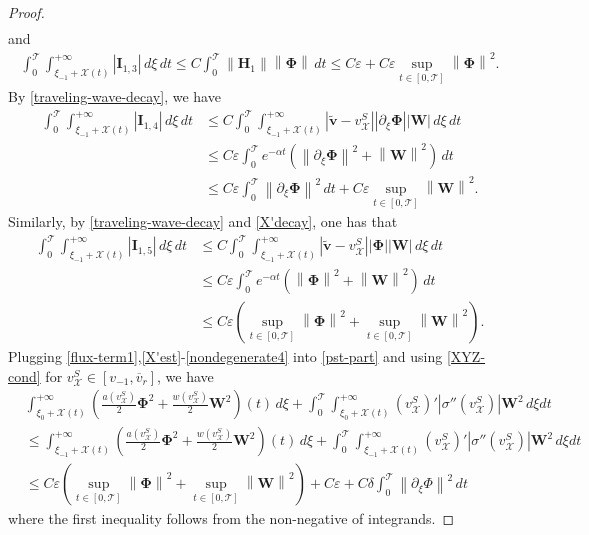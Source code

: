 \documentclass[12pt,reqno]{amsart}
\numberwithin{equation}{section}
\newcommand{\norm}[1]{\left\lVert #1 \right\rVert}
\def\p{\partial}
\def\T{\mathcal{T}}
\def\supt{\mathop{sup}\limits_{t \in [0,\mathcal{T}]}}
\def\ph{\mathbf{\Phi}}
\def\w{\mathbf{W}}
\def\vsx{v^S_{\mathcal{X}}}
\def\avr{\overline{v}_r}
\def\X{\mathcal{X}}
\begin{document}
\begin{proof}
\begin{equation}
\begin{aligned}
		\end{aligned}
	\end{equation}
	and
	\begin{equation}\label{nondegenerate2}
		\begin{aligned}
			\int_{0}^{\T} \int_{\xi_{-1}+\X(t)}^{+\infty}|\mathbf{I}_{1,3}|\,d\xi\,dt\leq C\int_{0}^{\T}\norm{\mathbf{H}_1}\norm{\ph}  \,dt\leq C\varepsilon+C\varepsilon \supt\norm{\ph}^2.
		\end{aligned}
	\end{equation}
	By \eqref{traveling-wave-decay}, we have
	\begin{equation}\label{nondegenerate3}
		\begin{aligned}
			\int_{0}^{\T} \int_{\xi_{-1}+\X(t)}^{+\infty}|\mathbf{I}_{1,4}|\,d\xi\,dt&\leq C\int_{0}^{\T} \int_{\xi_{-1}+\X(t)}^{+\infty}|\mathbf{\tilde{v}}-\vsx||\p_{\xi}\ph||\w|\,d\xi\,dt\\
			&\leq C\varepsilon\int_{0}^{\T}e^{-\alpha t}(\norm{\p_{\xi}\ph}^2+\norm{\w}^2)  \,dt\\
			&\leq C\varepsilon\int_{0}^{\T} \norm{\p_{\xi}\ph}^2 \,dt+C\varepsilon\supt\norm{\w}^2.
		\end{aligned}
	\end{equation}
	Similarly, by \eqref{traveling-wave-decay} and \eqref{X'decay}, one has that
	\begin{equation}\label{nondegenerate4}
		\begin{aligned}
			\int_{0}^{\T} \int_{\xi_{-1}+\X(t)}^{+\infty}|\mathbf{I}_{1,5}|\,d\xi\,dt&\leq C\int_{0}^{\T} \int_{\xi_{-1}+\X(t)}^{+\infty}|\mathbf{\tilde{v}}-\vsx||\ph||\w|\,d\xi\,dt\\
			&\leq C\varepsilon\int_{0}^{\T} e^{-\alpha t}(\norm{\ph}^2+\norm{\w}^2) \,dt\\
			&\leq C\varepsilon(\supt\norm{\ph}^2+\supt\norm{\w}^2).
		\end{aligned}
	\end{equation}
	Plugging \eqref{flux-term1},\eqref{X'est}-\eqref{nondegenerate4} into \eqref{pst-part} and using \eqref{XYZ-cond} for $\vsx\in[v_{-1},\avr]$, we have
	\begin{equation}\label{pst-integral}
		\begin{aligned}
			&\int_{\xi_{0}+\X(t)}^{+\infty}\left(\frac{a(\vsx)}{2}\ph^2+\frac{w(\vsx)}{2}\w^2\right)(t)\,d\xi+\int_{0}^{\T}\int_{\xi_{0}+\X(t)}^{+\infty}(\vsx)'|\sigma''(\vsx)|\w^2\,d\xi dt\\
			&\leq\int_{\xi_{-1}+\X(t)}^{+\infty}\left(\frac{a(\vsx)}{2}\ph^2+\frac{w(\vsx)}{2}\w^2\right)(t)\,d\xi+\int_{0}^{\T}\int_{\xi_{-1}+\X(t)}^{+\infty}(\vsx)'|\sigma''(\vsx)|\w^2\,d\xi dt\\
			&\leq C\varepsilon(\supt\norm{\ph}^2+\supt\norm{\w}^2)+C\varepsilon+C\delta\int_{0}^{\T}\norm{\p_{\xi}\Phi}^2\,dt
		\end{aligned}
	\end{equation}
	where the first inequality follows from the non-negative of integrands.
	

\end{proof}
\end{document}
